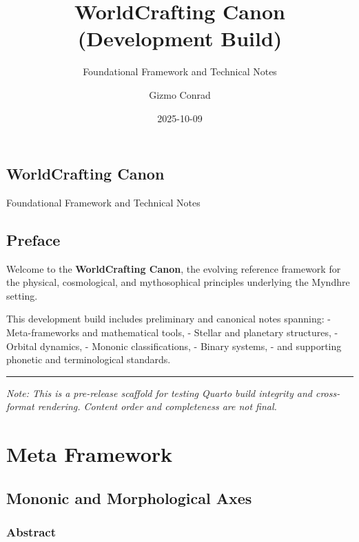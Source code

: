 \documentclass[
  letterpaper,
]{book}
\title{WorldCrafting Canon (Development Build)}
\subtitle{Foundational Framework and Technical Notes}
\author{Gizmo Conrad}
\date{2025-10-09}
\begin{document}
\frontmatter
\maketitle


\mainmatter
{}

\chapter{WorldCrafting Canon}\label{worldcrafting-canon}

Foundational Framework and Technical Notes

\hfill\break


\chapter{Preface}\label{preface}

Welcome to the \textbf{WorldCrafting Canon}, the evolving reference
framework for the physical, cosmological, and mythosophical principles
underlying the Myndhre setting.

This development build includes preliminary and canonical notes
spanning: - Meta-frameworks and mathematical tools, - Stellar and
planetary structures, - Orbital dynamics, - Mononic classifications, -
Binary systems, - and supporting phonetic and terminological standards.

\begin{center}\rule{0.5\linewidth}{0.5pt}\end{center}

\emph{Note: This is a pre-release scaffold for testing Quarto build
integrity and cross-format rendering. Content order and completeness are
not final.}

\part{Meta Framework}

\chapter{Mononic and Morphological
Axes}\label{mononic-and-morphological-axes}

\section{Abstract}\label{abstract}
\end{document}
